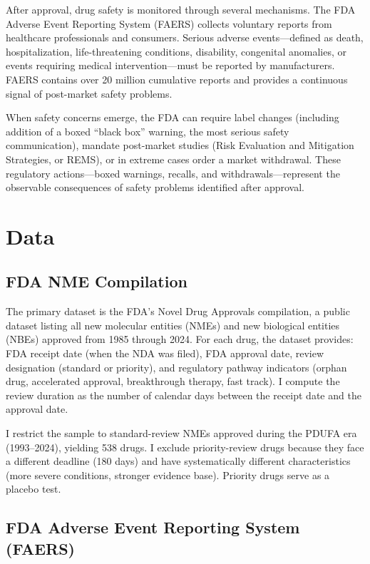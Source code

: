 \documentclass[12pt]{article}
\begin{document}
After approval, drug safety is monitored through several mechanisms. The FDA Adverse Event Reporting System (FAERS) collects voluntary reports from healthcare professionals and consumers. Serious adverse events---defined as death, hospitalization, life-threatening conditions, disability, congenital anomalies, or events requiring medical intervention---must be reported by manufacturers. FAERS contains over 20 million cumulative reports and provides a continuous signal of post-market safety problems.

When safety concerns emerge, the FDA can require label changes (including addition of a boxed ``black box'' warning, the most serious safety communication), mandate post-market studies (Risk Evaluation and Mitigation Strategies, or REMS), or in extreme cases order a market withdrawal. These regulatory actions---boxed warnings, recalls, and withdrawals---represent the observable consequences of safety problems identified after approval.

\section{Data}

\subsection{FDA NME Compilation}

The primary dataset is the FDA's Novel Drug Approvals compilation, a public dataset listing all new molecular entities (NMEs) and new biological entities (NBEs) approved from 1985 through 2024. For each drug, the dataset provides: FDA receipt date (when the NDA was filed), FDA approval date, review designation (standard or priority), and regulatory pathway indicators (orphan drug, accelerated approval, breakthrough therapy, fast track). I compute the review duration as the number of calendar days between the receipt date and the approval date.

I restrict the sample to standard-review NMEs approved during the PDUFA era (1993--2024), yielding 538 drugs. I exclude priority-review drugs because they face a different deadline (180 days) and have systematically different characteristics (more severe conditions, stronger evidence base). Priority drugs serve as a placebo test.

\subsection{FDA Adverse Event Reporting System (FAERS)}
\end{document}

